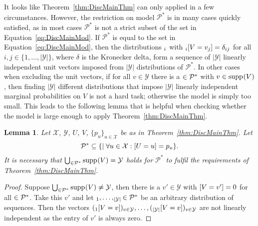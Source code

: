 \documentclass[a4paper]{report}
\theoremstyle{plain}
\newtheorem{lemma}[theorem]{Lemma}
\theoremstyle{definition}
\theoremstyle{remark}
\numberwithin{equation}{chapter}
\let\P\relax
\DeclareMathOperator{\P}{\mathbb{P}}
\DeclareMathOperator{\1}{\mathbbm{1}}
\newcommand{\X}{\mathcal{X}}
\newcommand{\Y}{\mathcal{Y}}
\DeclareMathOperator{\supp}{supp}
\newcommand{\Pmod}{\mathcal{P}^*}
\begin{document}
It looks like Theorem~\ref{thm:DiscMainThm} can only applied in a few circumstances. However, the restriction on model $\Pmod$ is in many cases quickly satisfied, as in most cases $\Pmod$ is not a strict subset of the set in Equation~\ref{eq:DiscMainMod}. If $\Pmod$ is equal to the set in Equation~\ref{eq:DiscMainMod}, then the distributions $\P_i$ with $\P_i[V=v_j]=\delta_{ij}$ for all $i,j\in\{1,\ldots,|\Y|\}$, where $\delta$ is the Kronecker delta, form a sequence of $|\Y|$ linearly independent unit vectors imposed from $|\Y|$ distributions of $\Pmod$. In other cases when excluding the unit vectors, if for all $v\in\Y$ there is a $\P\in\Pmod$ with $v\in\supp_{\P}(V)$, then finding $|\Y|$ different distributions that impose $|\Y|$ linearly independent marginal probabilities on $V$ is not a hard task; otherwise the model is simply too small. This leads to the following lemma that is helpful when checking whether the model is large enough to apply Theorem~\ref{thm:DiscMainThm}.
\begin{lemma}\label{lem:DiscMainReq}
Let $\X$, $\Y$, $U$, $V$, $\{p_u\}_{u\in\X}$ be as in Theorem~\ref{thm:DiscMainThm}.  Let 
\begin{equation}
\Pmod\subseteq\{\P\mid\forall u\in\X:\P[U=u]=p_u\}.
\end{equation}
It is necessary that $\bigcup_{\P\in\Pmod}\supp_{\P}(V)=\Y$ holds for $\Pmod$ to fulfil the requirements of Theorem~\ref{thm:DiscMainThm}.
\end{lemma}
\begin{proof}
Suppose $\bigcup_{\P\in\Pmod}\supp_{\P}(V)\neq\Y$, then there is a $v'\in\Y$ with $\P[V=v']=0$ for all $\P\in\Pmod$. Take this $v'$ and let $\P_1,\ldots,\P_{|\Y|}\in\Pmod$ be an arbitrary distribution of sequences. Then the vectors $(\P_1[V=v])_{v\in\Y},\ldots,(\P_{|\Y|}[V=v])_{v\in\Y}$ are not linearly independent as the entry of $v'$ is always zero.
\end{proof}
\end{document}
